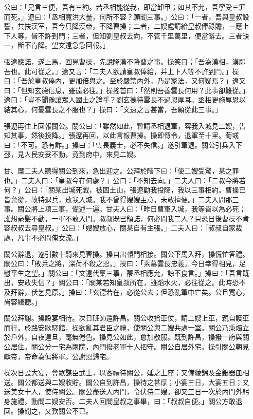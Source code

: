公曰：「兄言三便，吾有三約。若丞相能從我，即當卸甲；如其不允，吾寧受三罪而死。」遼曰：「丞相寬洪大量，何所不容？願聞三事。」公曰：「一者，吾與皇叔設誓，共扶漢室，吾今只降漢帝，不降曹操；二者，二嫂處請給皇叔俸祿贍，一應上下人等，皆不許到門；三者，但知劉皇叔去向，不管千里萬里，便當辭去。三者缺一，斷不肯降。望文遠急急回報。」

張遼應諾，遂上馬，回見曹操，先說降漢不降曹之事。操笑曰；「吾為漢相，漢即吾也。此可從之。」遼又言：「二夫人欲請皇叔俸給，并上下人等不許到門。」操曰：「吾於皇叔俸內，更加倍與之。至於嚴禁內外，乃是家法，又何疑焉？」遼又曰：「但知玄德信息，雖遠必往。」操搖首曰：「然則吾養雲長何用？此事卻難從。」遼曰：「豈不聞豫讓眾人國士之論乎？劉玄德待雲長不過恩厚耳。丞相更施厚恩以結其心，何憂雲長之不服也？」操曰：「文遠之言甚當，吾願從此三事。」

張遼再往上回報關公。關公曰：「雖然如此，暫請丞相退軍，容我入城見二嫂，告知其事，然後投降。」張遼再回，以此言報曹操。操即傳令，退軍至十里。荀彧曰：「不可。恐有詐。」操曰：「雲長義士，必不失信。」遂引軍退。關公引兵入下邳，見人民安妥不動，竟到府中，來見二嫂。

甘、糜二夫人聽得關公到來，急出迎之。公拜於階下曰：「使二嫂受驚，某之罪也。」二夫人曰：「皇叔今在何處？」公曰：「不知去向。」二夫人曰：「二叔今將若何？」公曰：「關某出城死戰，被困土山，張遼勸我投降，我以三事相約。曹操已皆允從，故特退兵，放我入城。我不曾得嫂嫂主意，未敢擅便。」二夫人問那三事。關公將上項三事，備述一遍。甘夫人曰：「昨日曹軍入城，我等皆以為必死；誰想毫髮不動，一軍不敢入門。叔叔既已領諾，何必問我二人？只恐日後曹操不肯容叔叔去尋皇叔。」公曰：「嫂嫂放心，關某自有主張。」二夫人曰：「叔叔自家裁處，凡事不必問俺女流。」

關公辭退，遂引數十騎來見曹操。操自出轅門相接。關公下馬入拜，操慌忙答禮。關公曰：「敗兵之將，深荷不殺之恩。」操曰：「素慕雲長忠義，今日幸得相見，足慰平生之望。」關公曰：「文遠代稟三事，蒙丞相應允，諒不食言。」操曰：「吾言既出，安敢失信？」關公曰：「關某若知皇叔所在，雖蹈水火，必往從之。此時恐不及拜辭，伏乞見原。」操曰：「玄德若在，必從公去；但恐亂軍中亡矣。公且寬心，尚容緝聽。」

關公拜謝。操設宴相待。次日班師還許昌。關公收拾車仗，請二嫂上車，親自護車而行。於路安歇驛館，操欲亂其君臣之禮，使關公與二嫂共處一室。關公乃秉燭立於戶外，自夜達旦，毫無倦色。操見公如此，愈加敬服。既到許昌，操撥一府與關公居住。關公分一宅為兩院，內門撥老軍十人把守。關公自居外宅。操引關公朝見獻帝，帝命為偏將軍。公謝恩歸宅。

操次日設大宴，會眾謀臣武士，以客禮待關公，延之上座；又備綾錦及金銀器皿相送。關公都送與二嫂收貯。關公自到許昌，操待之甚厚；小宴三日，大宴五日；又送美女十人，使侍關公。關公盡送入內門，令伏侍二嫂。卻又三日一次於內門外躬身施禮，動問二嫂安否。二夫人回問皇叔之事畢，曰：「叔叔自便。」關公方敢退回。操聞之，又歎關公不已。

